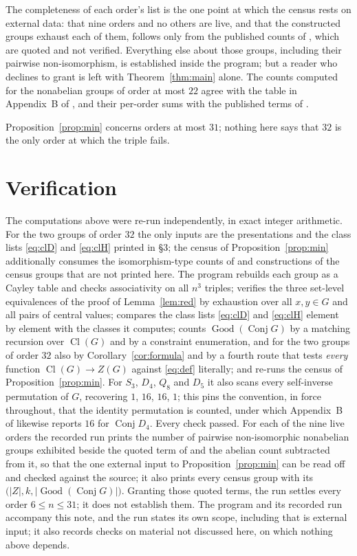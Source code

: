 \documentclass[11pt]{amsart}
\theoremstyle{definition}
\newcommand{\Conj}{\operatorname{Conj}}
\newcommand{\Good}{\operatorname{Good}}
\newcommand{\Cl}{\operatorname{Cl}}
\newcommand{\Zc}{Z}
\begin{document}
\noindent
The completeness of each order's list is the one point at which the census rests on external
data: that nine orders and no others are live, and that the constructed groups exhaust each
of them, follows only from the published counts of \cite{A000001}, which are quoted and not
verified. Everything else about those groups, including their pairwise non-isomorphism, is
established inside the program; but a reader who declines to grant \cite{A000001} is left
with Theorem~\ref{thm:main} alone. The counts computed for
the nonabelian groups of order at most $22$ agree with the table in Appendix~B of \cite{Ta},
and their per-order sums with the published terms of \cite{A386233}.

Proposition~\ref{prop:min} concerns orders at most $31$; nothing here says that $32$ is the
only order at which the triple fails.

\section{Verification}

The computations above were re-run independently, in exact integer arithmetic. For the two
groups of order $32$ the only inputs are the presentations and the class lists
\eqref{eq:clD} and \eqref{eq:clH} printed in \S3; the census of
Proposition~\ref{prop:min} additionally consumes the isomorphism-type counts of
\cite{A000001} and constructions of the census groups that are not printed here. The program
rebuilds each group as a Cayley table and checks associativity on all $n^{3}$ triples;
verifies the three set-level equivalences of the proof of Lemma~\ref{lem:red} by exhaustion
over all $x,y\in G$ and all pairs of central values; compares the class lists
\eqref{eq:clD} and \eqref{eq:clH} element by element with the classes it computes; counts
$\Good(\Conj G)$ by a matching recursion over $\Cl(G)$ and by a constraint enumeration, and
for the two groups of order $32$ also by Corollary~\ref{cor:formula} and by a fourth route
that tests \emph{every} function $\Cl(G)\to \Zc(G)$ against \eqref{eq:def} literally; and
re-runs the
census of Proposition~\ref{prop:min}. For $S_3$, $D_4$, $Q_8$ and $D_5$ it also scans every
self-inverse permutation of $G$, recovering $1$, $16$, $16$, $1$; this pins the convention,
in force throughout, that the identity permutation is counted, under which Appendix~B of
\cite{Ta} likewise reports $16$ for $\Conj D_4$. Every check passed. For each of the nine
live orders the recorded run prints the number of pairwise non-isomorphic nonabelian groups
exhibited beside the quoted term of \cite{A000001} and the abelian count subtracted from it,
so that the one external input to Proposition~\ref{prop:min} can be read off and checked
against the source; it also prints every census group with its
$\bigl(\lvert \Zc\rvert,k,\lvert\Good(\Conj G)\rvert\bigr)$. Granting those quoted terms,
the run settles every order $6\le n\le 31$; it does not establish them. The program and its
recorded run accompany this note, and the run states its own scope, including that
\cite{A000001} is external input; it also records checks on material not discussed here, on
which nothing above depends.
\end{document}

